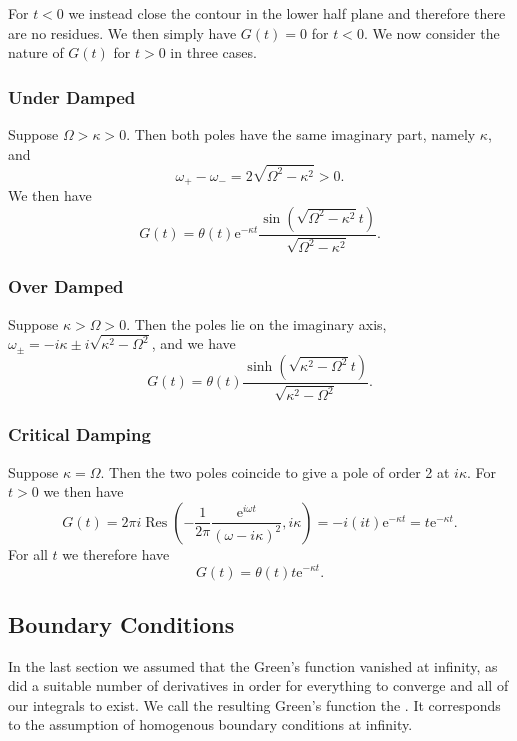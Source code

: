 \documentclass[fleqn]{NotesClass}
\newcommand*{\e}{\mathrm{e}}
\DeclareMathOperator{\Res}{Res}
\begin{document}
    For \(t < 0\) we instead close the contour in the lower half plane and therefore there are no residues.
    We then simply have \(G(t) = 0\) for \(t < 0\).
    We now consider the nature of \(G(t)\) for \(t > 0\) in three cases.
    
    \subsubsection{Under Damped}
    Suppose \(\Omega > \kappa > 0\).
    Then both poles have the same imaginary part, namely \(\kappa\), and
    \begin{equation}
        \omega_{+} - \omega_{-} = 2\sqrt{\Omega^2 - \kappa^2} > 0.
    \end{equation}
    We then have
    \begin{equation}
        G(t) = \theta(t) \e^{-\kappa t} \frac{\sin(\sqrt{\Omega^2 - \kappa^2} t)}{\sqrt{\Omega^2 - \kappa^2}}.
    \end{equation}
    
    \subsubsection{Over Damped}
    Suppose \(\kappa > \Omega > 0\).
    Then the poles lie on the imaginary axis, \(\omega_{\pm} = -i\kappa \pm i\sqrt{\kappa^2 - \Omega^2}\), and we have
    \begin{equation}
        G(t) = \theta(t) \frac{\sinh(\sqrt{\kappa^2 - \Omega^2} t)}{\sqrt{\kappa^2 - \Omega^2}}.
    \end{equation}
    
    \subsubsection{Critical Damping}
    Suppose \(\kappa = \Omega\).
    Then the two poles coincide to give a pole of order 2 at \(i\kappa\).
    For \(t > 0\) we then have
    \begin{equation}
        G(t) = 2\pi i\Res\left( -\frac{1}{2\pi}\frac{\e^{i\omega t}}{(\omega - i\kappa)^2}, i\kappa \right) = -i(it)\e^{-\kappa t} = t\e^{-\kappa t}.
    \end{equation}
    For all \(t\) we therefore have
    \begin{equation}
        G(t) = \theta(t) t\e^{-\kappa t}.
    \end{equation}
    
    \subsection{Boundary Conditions}
    In the last section we assumed that the Green's function vanished at infinity, as did a suitable number of derivatives in order for everything to converge and all of our integrals to exist.
    We call the resulting Green's function the .
    It corresponds to the assumption of homogenous boundary conditions at infinity.
    
\end{document}
